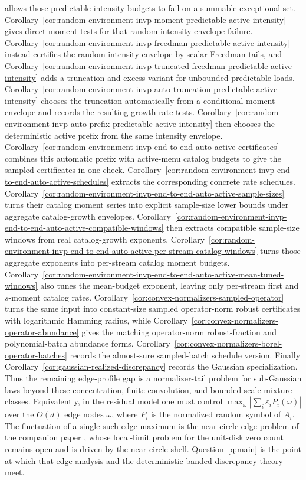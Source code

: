 \documentclass[11pt]{amsart}
\numberwithin{equation}{section}
\theoremstyle{definition}
\theoremstyle{remark}
\newcommand{\abs}[1]{\left\lvert #1\right\rvert}
\newcommand{\eps}{\varepsilon}
\begin{document}
allows those predictable intensity budgets to fail on a summable exceptional
set.
Corollary~\ref{cor:random-environment-invp-moment-predictable-active-intensity}
gives direct moment tests for that random intensity-envelope failure.
Corollary~\ref{cor:random-environment-invp-freedman-predictable-active-intensity}
instead certifies the random intensity envelope by scalar Freedman tails, and
Corollary~\ref{cor:random-environment-invp-truncated-freedman-predictable-active-intensity}
adds a truncation-and-excess variant for unbounded predictable loads.
Corollary~\ref{cor:random-environment-invp-auto-truncation-predictable-active-intensity}
chooses the truncation automatically from a conditional moment envelope and
records the resulting growth-rate tests.
Corollary~\ref{cor:random-environment-invp-auto-prefix-predictable-active-intensity}
then chooses the deterministic active prefix from the same intensity envelope.
Corollary~\ref{cor:random-environment-invp-end-to-end-auto-active-certificates}
combines this automatic prefix with active-menu catalog budgets to give the
sampled certificates in one check.
Corollary~\ref{cor:random-environment-invp-end-to-end-auto-active-schedules}
extracts the corresponding concrete rate schedules.
Corollary~\ref{cor:random-environment-invp-end-to-end-auto-active-sample-sizes}
turns their catalog moment series into explicit sample-size lower bounds under
aggregate catalog-growth envelopes.
Corollary~\ref{cor:random-environment-invp-end-to-end-auto-active-compatible-windows}
then extracts compatible sample-size windows from real catalog-growth exponents.
Corollary~\ref{cor:random-environment-invp-end-to-end-auto-active-per-stream-catalog-windows}
turns those aggregate exponents into per-stream catalog moment budgets.
Corollary~\ref{cor:random-environment-invp-end-to-end-auto-active-mean-tuned-windows}
also tunes the mean-budget exponent, leaving only per-stream first and
\(s\)-moment catalog rates.
Corollary~\ref{cor:convex-normalizers-sampled-operator} turns the same input
into constant-size sampled operator-norm robust certificates with logarithmic
Hamming radius, while
Corollary~\ref{cor:convex-normalizers-operator-abundance} gives the matching
operator-norm robust-fraction and polynomial-batch abundance forms.
Corollary~\ref{cor:convex-normalizers-borel-operator-batches} records the
almost-sure sampled-batch schedule version.  Finally
Corollary~\ref{cor:gaussian-realized-discrepancy} records the Gaussian
specialization.  Thus the remaining edge-profile gap is a normalizer-tail problem
for sub-Gaussian laws beyond these concentration, finite-convolution, and
bounded scale-mixture classes.
Equivalently, in the residual model one must control
$\max_{\omega}\abs{\sum_i\eps_iP_i(\omega)}$ over the $O(d)$ edge nodes $\omega$,
where $P_i$ is the normalized random symbol of $A_i$. The fluctuation of a single
such edge maximum is the near-circle edge problem of the companion paper
\cite{Shmalo-paper5}, whose local-limit problem for the unit-disk zero count
remains open and is driven by the near-circle shell. Question~\ref{q:main} is
the point at which that edge analysis and the deterministic banded discrepancy
theory meet.
\end{document}
